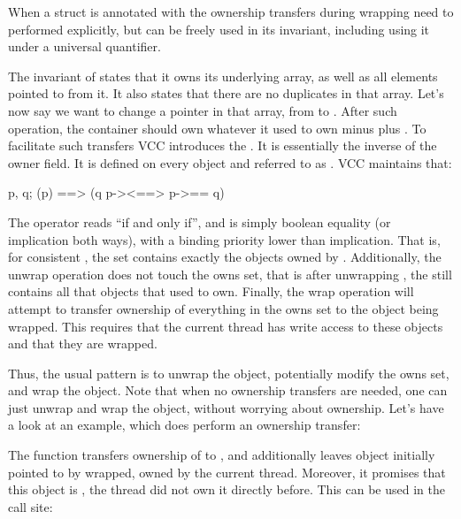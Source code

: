 When a struct is annotated with  the ownership transfers
during wrapping need to performed explicitly, but  can
be freely used in its invariant, including using it under a universal
quantifier.


\noindent
The invariant of  states that it owns its underlying array,
as well as all elements pointed to from it.
It also states that there are no duplicates in that array.
Let's now say we want to change a pointer in that array,
from  to .
After such operation, the container should own whatever it used
to own minus  plus .
To facilitate such transfers VCC introduces the .
It is essentially the inverse of the owner field.
It is defined on every object  and referred to as .
VCC maintains that:
\begin{VCC}
\forall \object p, q; \consistent(p) ==> 
  (q \in p->\owns <==> p->\owner == q)
\end{VCC}
The operator \vcc{<==>} reads ``if and only if'', and is simply boolean
equality (or implication both ways), with a binding priority lower than implication.
That is, for consistent , the set  contains exactly
the objects owned by .
Additionally, the unwrap operation does not touch the owns set,
that is after unwrapping , the  still contains
all that objects that  used to own.
Finally, the wrap operation will attempt to transfer ownership
of everything in the owns set to the object being wrapped.
This requires that the current thread has write access to these objects
and that they are wrapped.

Thus, the usual pattern is to unwrap the object, potentially modify the owns
set, and wrap the object.
Note that when no ownership transfers are needed, one can just unwrap
and wrap the object, without worrying about ownership.
Let's have a look at an example, which does perform an ownership transfer:


\noindent
The  function transfers ownership of  to ,
and additionally leaves object initially pointed to by 
wrapped, \ie owned by the current thread.
Moreover, it promises that this object is , \ie the thread did not own
it directly before.
This can be used in the call site:


